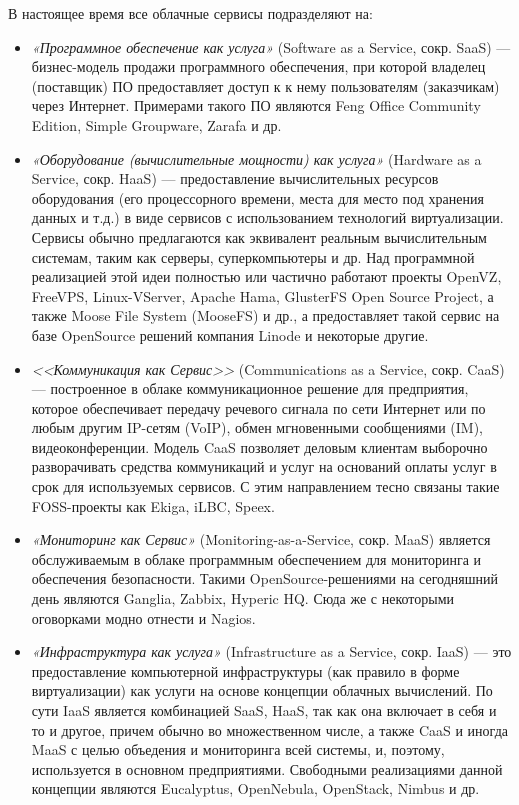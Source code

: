 \documentclass[a5paper,10pt]{article}
\begin{document}
В настоящее время все облачные сервисы подразделяют на:
\begin{itemize}
\item \emph{«Программное обеспечение как услуга»} (Software as a Service, сокр. SaaS) --- бизнес-модель продажи программного обеспечения, при которой владелец (поставщик) ПО предоставляет доступ к к нему пользователям (заказчикам) через Интернет. Примерами такого ПО являются Feng Office Community Edition, Simple Groupware, Zarafa и др.
\item \emph{«Оборудование (вычислительные мощности) как услуга»} (Hardware as a Service, сокр. HaaS) --- предоставление  вычислительных ресурсов оборудования (его процессорного времени, места для место под хранения данных и т.д.) в виде сервисов с использованием технологий виртуализации. Сервисы обычно предлагаются как эквивалент реальным вычислительным системам, таким как серверы, суперкомпьютеры и др. Над программной реализацией этой идеи полностью или частично работают проекты OpenVZ, FreeVPS, Linux-VServer, Apache Hama, GlusterFS Open Source Project, а также Moose File System (MooseFS) и др., а предоставляет такой сервис на базе OpenSource решений компания Linode и некоторые другие.
\item \emph{<<Коммуникация как Сервис>>} (Communications as a Service, сокр. CaaS) --- построенное в облаке коммуникационное решение для предприятия, которое обеспечивает передачу речевого сигнала по сети Интернет или по любым другим IP-сетям (VoIP), обмен мгновенными сообщениями (IM), видеоконференции. Модель CaaS позволяет деловым клиентам выборочно разворачивать средства коммуникаций и услуг на оснований оплаты услуг в срок для используемых сервисов. С этим направлением тесно связаны такие FOSS-проекты как Ekiga, iLBC, Speex.
\item \emph{«Мониторинг как Сервис»} (Monitoring-as-a-Service, сокр. MaaS) является обслуживаемым в облаке программным обеспечением для мониторинга и обеспечения безопасности. Такими OpenSource-решениями на сегодняшний день являются Ganglia, Zabbix, Hyperic HQ. Сюда же  с некоторыми оговорками модно отнести и Nagios. 
\item \emph{«Инфраструктура как услуга»} (Infrastructure as a Service, сокр. IaaS) --- это предоставление компьютерной инфраструктуры (как правило в форме виртуализации) как услуги на основе концепции облачных вычислений. По сути IaaS является комбинацией SaaS,  HaaS, так как она включает в себя и то и другое, причем обычно во множественном числе, а также CaaS и иногда MaaS с целью объедения и мониторинга всей системы, и, поэтому, используется в основном предприятиями. Свободными реализациями данной концепции являются Eucalyptus, OpenNebula, OpenStack, Nimbus и др.

\end{itemize}
\end{document}
